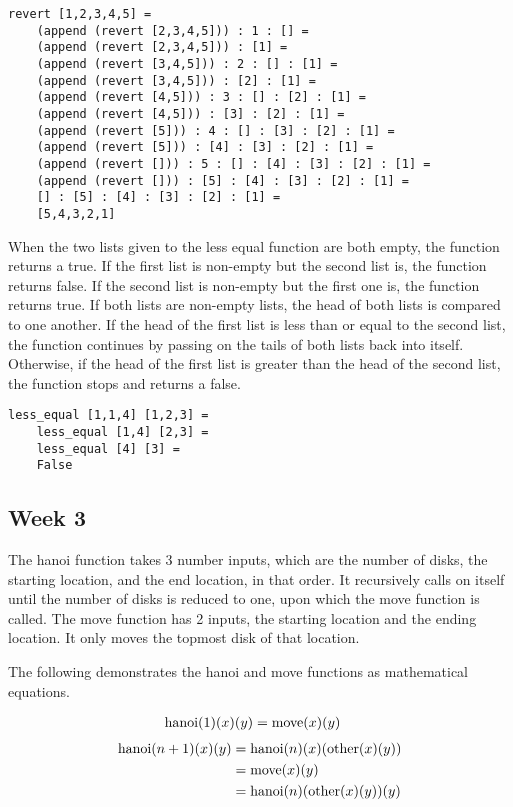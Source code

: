 \documentclass{article}
\theoremstyle{theorem}
\theoremstyle{definition}
\theoremstyle{remark}
\begin{document}
\begin{lstlisting}
revert [1,2,3,4,5] =
	(append (revert [2,3,4,5])) : 1 : [] =
	(append (revert [2,3,4,5])) : [1] =
	(append (revert [3,4,5])) : 2 : [] : [1] =
	(append (revert [3,4,5])) : [2] : [1] =
	(append (revert [4,5])) : 3 : [] : [2] : [1] =
	(append (revert [4,5])) : [3] : [2] : [1] =
	(append (revert [5])) : 4 : [] : [3] : [2] : [1] =
	(append (revert [5])) : [4] : [3] : [2] : [1] =
	(append (revert [])) : 5 : [] : [4] : [3] : [2] : [1] =
	(append (revert [])) : [5] : [4] : [3] : [2] : [1] =
	[] : [5] : [4] : [3] : [2] : [1] =
	[5,4,3,2,1]
\end{lstlisting}
%
When the two lists given to the less equal function are both empty, the function returns a true. If the first list is non-empty but the second list is, the function returns false. If the second list is non-empty but the first one is, the function returns true. If both lists are non-empty lists, the head of both lists is compared to one another. If the head of the first list is less than or equal to the second list, the function continues by passing on the tails of both lists back into itself. Otherwise, if the head of the first list is greater than the head of the second list, the function stops and returns a false.

\begin{lstlisting}
less_equal [1,1,4] [1,2,3] =
	less_equal [1,4] [2,3] =
	less_equal [4] [3] =
	False
\end{lstlisting}

\subsection{Week 3}

The hanoi function takes 3 number inputs, which are the number of disks, the starting location, and the end location, in that order. It recursively calls on itself until the number of disks is reduced to one, upon which the move function is called. The move function has 2 inputs, the starting location and the ending location. It only moves the topmost disk of that location.

\medskip\noindent
The following demonstrates the hanoi and move functions as mathematical equations.

\begin{align*}
{\rm hanoi} (1) (x) (y)
& = {\rm move}(x)(y)
\end{align*}
\begin{align*}
{\rm hanoi} (n+1) (x) (y)
& = {\rm hanoi} (n) (x) ({\rm other}(x)(y)) \\
& = {\rm move}(x)(y)\\
& = {\rm hanoi} (n) ({\rm other}(x)(y)) (y)
\end{align*}
\end{document}
